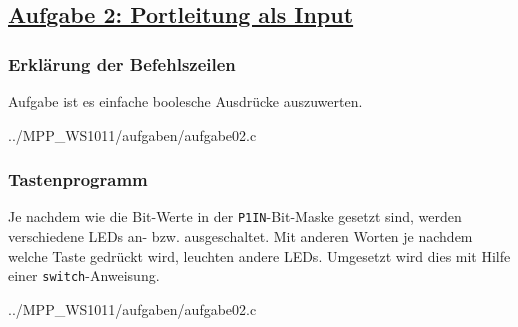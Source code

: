 \subsection
{\href{http://cst.mi.fu-berlin.de/intern/19606-P-MPP/Aufgaben/040102.html}
{Aufgabe 2: Portleitung als Input}}

\subsubsection*{Erklärung der Befehlszeilen}
Aufgabe ist es einfache boolesche Ausdrücke auszuwerten.

{../MPP_WS1011/aufgaben/aufgabe02.c}

\subsubsection*{Tastenprogramm}
Je nachdem wie die Bit-Werte in der \texttt{P1IN}-Bit-Maske gesetzt sind, werden verschiedene LEDs an- bzw. ausgeschaltet. Mit anderen Worten je nachdem welche Taste gedrückt wird, leuchten andere LEDs.
Umgesetzt wird dies mit Hilfe einer \texttt{switch}-Anweisung.

{../MPP_WS1011/aufgaben/aufgabe02.c}
